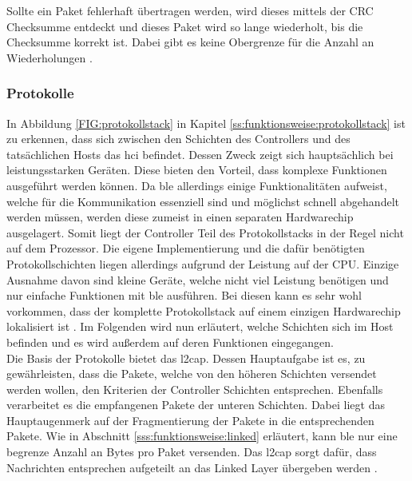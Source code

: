 \noindent Sollte ein Paket fehlerhaft übertragen werden, wird dieses mittels der CRC Checksumme entdeckt und dieses Paket wird so lange wiederholt, bis die Checksumme korrekt ist. Dabei gibt es keine Obergrenze für die Anzahl an Wiederholungen \cite[Seite 23]{Townsend14:GSB}.\\

\subsubsection{Protokolle}
\label{sss:funktionsweise:protocoll}

In Abbildung \ref{FIG:protokollstack} in Kapitel \ref{ss:funktionsweise:protokollstack} ist zu erkennen, dass sich zwischen den Schichten des Controllers und des tatsächlichen Hosts das \ac{hci} befindet. Dessen Zweck zeigt sich hauptsächlich bei leistungsstarken Geräten. Diese bieten den Vorteil, dass komplexe Funktionen ausgeführt werden können. Da \ac{ble} allerdings einige Funktionalitäten aufweist, welche für die Kommunikation essenziell sind und möglichst schnell abgehandelt werden müssen, werden diese zumeist in einen separaten Hardwarechip ausgelagert. Somit liegt der Controller Teil des Protokollstacks in der Regel nicht auf dem Prozessor. Die eigene Implementierung und die dafür benötigten Protokollschichten liegen allerdings aufgrund der Leistung auf der CPU. Einzige Ausnahme davon sind kleine Geräte, welche nicht viel Leistung benötigen und nur einfache Funktionen mit \ac{ble} ausführen. Bei diesen kann es sehr wohl vorkommen, dass der komplette Protokollstack auf einem einzigen Hardwarechip lokalisiert ist \cite[Seite 24]{Townsend14:GSB}. Im Folgenden wird nun erläutert, welche Schichten sich im Host befinden und es wird außerdem auf deren Funktionen eingegangen.\\  

\noindent Die Basis der Protokolle bietet das \ac{l2cap}. Dessen Hauptaufgabe ist es, zu gewährleisten, dass die Pakete, welche von den höheren Schichten versendet werden wollen, den Kriterien der Controller Schichten entsprechen. Ebenfalls verarbeitet es die empfangenen Pakete der unteren Schichten. Dabei liegt das Hauptaugenmerk auf der Fragmentierung der Pakete in die entsprechenden Pakete. Wie in Abschnitt \ref{sss:funktionsweise:linked} erläutert, kann \ac{ble} nur eine begrenze Anzahl an Bytes pro Paket versenden. Das \ac{l2cap} sorgt dafür, dass Nachrichten entsprechen aufgeteilt an das Linked Layer übergeben werden \cite{TI:WWW}.\\

